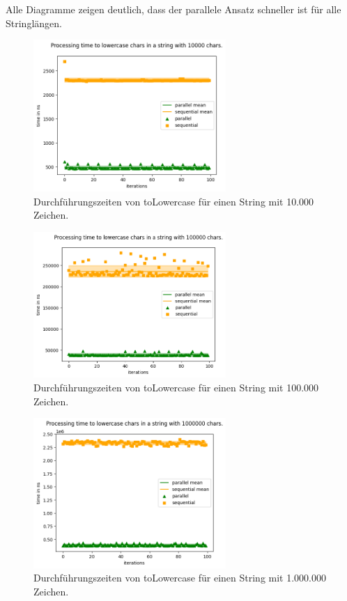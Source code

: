 \documentclass[plainarticle,zihtitle,german,final,hyperref,utf8]{zihpub}
\begin{document}
Alle Diagramme zeigen deutlich, dass der parallele Ansatz schneller ist für alle Stringlängen.
\begin{figure}[h]
	\begin{center}
		\includegraphics[width=0.65\textwidth]{images/comp_lower_10000.png}
		\caption{Durchführungszeiten von toLowercase für einen String mit 10.000 Zeichen.}
	\end{center}
\end{figure}\label{fig:low_10k}
\begin{figure}[h]
	\begin{center}
		\includegraphics[width=0.65\textwidth]{images/comp_lower_100000.png}
		\caption{Durchführungszeiten von toLowercase für einen String mit 100.000 Zeichen.}
	\end{center}
\end{figure}
\begin{figure}[h]
	\begin{center}
		\includegraphics[width=0.65\textwidth]{images/comp_lower_1000000.png}
		\caption{Durchführungszeiten von toLowercase für einen String mit 1.000.000 Zeichen.}
	\end{center}
\end{figure}
\end{document}
